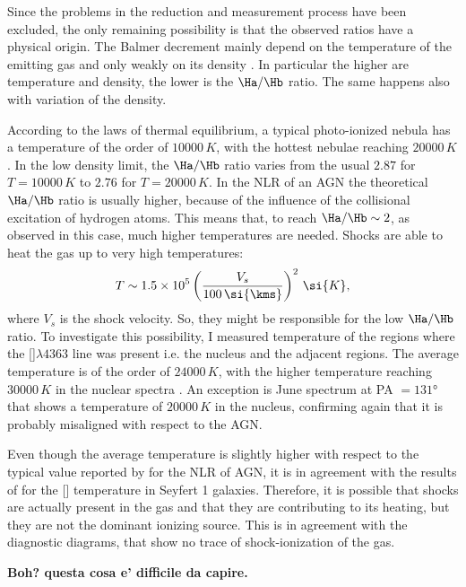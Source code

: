 Since the problems in the reduction and measurement process have been excluded, the only remaining possibility is that the observed ratios have a physical origin.
The Balmer decrement mainly depend on the temperature of the emitting gas and only weakly on its density \citep{OsterbrockAGN}.
In particular the higher are temperature and density, the lower is the $\Ha/\Hb$ ratio.
The same happens also with variation of the density.

According to the laws of thermal equilibrium, a typical photo-ionized nebula has a temperature of the order of $10000\,\si{K}$, with the hottest nebulae reaching $20000\,\si{K}$ \citep{OsterbrockAGN}.
In the low density limit, the $\Ha/\Hb$ ratio varies from the usual $2.87$ for $T=10000\,\si{K}$ to $2.76$ for $T=20000\,\si{K}$.
In the NLR of an AGN the theoretical $\Ha/\Hb$ ratio is usually higher, because of the influence of the collisional excitation of hydrogen atoms.
This means that, to reach $\Ha/\Hb\sim 2$, as observed in this case, much higher temperatures are needed.
Shocks are able to heat the gas up to very high temperatures:
\begin{equation}
    \label{eq:T_shock}
    T\sim 1.5\times 10^5 \left(\frac{V_s}{100\,\si{\kms}}\right)^2\,\si{K},
\end{equation}
where $V_s$ is the shock velocity.
So, they might be responsible for the low $\Ha/\Hb$ ratio.
To investigate this possibility, I measured temperature of the regions where the []$\lambda4363$ line was present i.e. the nucleus and the adjacent regions.
The average temperature is of the order of $24000\,\si{K}$, with the higher temperature reaching $30000\,\si{K}$ in the nuclear spectra .
An exception is June spectrum at PA $=\ang{131}$ that shows a temperature of $20000\,\si{K}$ in the nucleus, confirming again that it is probably misaligned with respect to the AGN.

Even though the average temperature is slightly higher with respect to the typical value reported by \citet{OsterbrockAGN} for the NLR of AGN, it is in agreement with the results of \citet{Vaona12} for the [] temperature in Seyfert 1 galaxies.
Therefore, it is possible that shocks are actually present in the gas and that they are contributing to its heating, but they are not the dominant ionizing source.
This is in agreement with the diagnostic diagrams, that show no trace of shock-ionization of the gas.

\textbf{Boh? questa cosa e' difficile da capire.}
